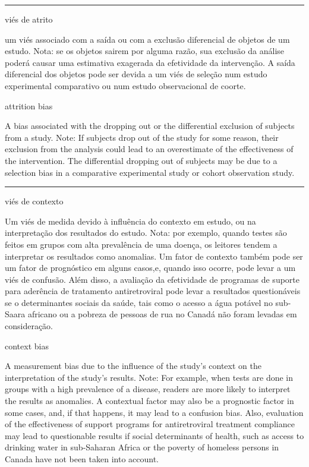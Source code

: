 \documentclass[
  openany]{book}
\begin{document}
\begin{center}\rule{0.5\linewidth}{0.5pt}\end{center}

viés de atrito

um viés associado com a saída ou com a exclusão diferencial de objetos de um estudo. Nota: se os objetos sairem por alguma razão, sua exclusão da análise poderá causar uma estimativa exagerada da efetividade da intervenção. A saída diferencial dos objetos pode ser devida a um viés de seleção num estudo experimental comparativo ou num estudo observacional de coorte.

attrition bias

A bias associated with the dropping out or the differential exclusion of subjects from a study. Note: If subjects drop out of the study for some reason, their exclusion from the analysis could lead to an overestimate of the effectiveness of the intervention. The differential dropping out of subjects may be due to a selection bias in a comparative experimental study or cohort observation study.

\begin{center}\rule{0.5\linewidth}{0.5pt}\end{center}

viés de contexto

Um viés de medida devido à influência do contexto em estudo, ou na interpretação dos resultados do estudo. Nota: por exemplo, quando testes são feitos em grupos com alta prevalência de uma doença, os leitores tendem a interpretar os resultados como anomalias. Um fator de contexto também pode ser um fator de prognóstico em alguns casos,e, quando isso ocorre, pode levar a um viés de confusão. Além disso, a avaliação da efetividade de programas de suporte para aderência de tratamento antiretroviral pode levar a resultados questionáveis se o determinantes sociais da saúde, tais como o acesso a água potável no sub-Saara africano ou a pobreza de pessoas de rua no Canadá não foram levadas em consideração.

context bias

A measurement bias due to the influence of the study's context on the interpretation of the study's results. Note: For example, when tests are done in groups with a high prevalence of a disease, readers are more likely to interpret the results as anomalies. A contextual factor may also be a prognostic factor in some cases, and, if that happens, it may lead to a confusion bias. Also, evaluation of the effectiveness of support programs for antiretroviral treatment compliance may lead to questionable results if social determinants of health, such as access to drinking water in sub-Saharan Africa or the poverty of homeless persons in Canada have not been taken into account.
\end{document}
